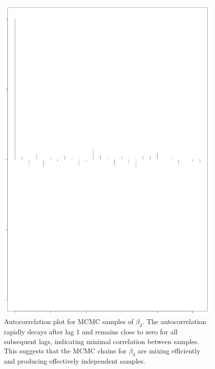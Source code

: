 \documentclass[]{article}
\begin{document}
\begin{figure}
	\centering
	\includegraphics[width=0.7\linewidth]{img/img-autocorr-beta3}
	\caption{Autocorrelation plot for MCMC samples of $\beta_3$. The autocorrelation rapidly decays after lag 1 and remains close to zero for all subsequent lags, indicating minimal correlation between samples. This suggests that the MCMC chains for $\beta_3$ are mixing efficiently and producing effectively independent samples.}
	\label{fig:img-autocorr-beta3}
\end{figure}
\end{document}
